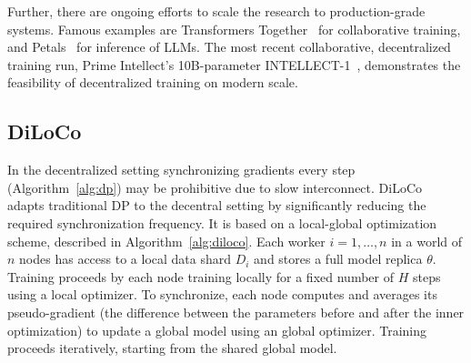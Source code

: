 \documentclass{article}
\begin{document}
Further, there are ongoing efforts to scale the research to production-grade
systems. Famous examples are Transformers
Together~\cite{diskin2021collaborativelearning} for collaborative training, and
Petals~\cite{borzunov2023petals} for inference of LLMs.  The most recent
collaborative, decentralized training run, Prime Intellect's 10B-parameter
INTELLECT-1~\cite{jaghouar2024intellect1}, demonstrates the feasibility of
decentralized training on modern scale.







\subsection{DiLoCo}

In the decentralized setting synchronizing gradients every step
(Algorithm~\ref{alg:dp}) may be prohibitive due to slow interconnect.
DiLoCo~\cite{douillard2023diloco} adapts traditional DP to the decentral setting
by significantly reducing the required synchronization frequency. It is based on
a local-global optimization scheme, described in Algorithm~\ref{alg:diloco}.
Each worker $i=1,\dots,n$ in a world of $n$ nodes has access to a local data
shard $D_i$ and stores a full model replica $\theta$. Training proceeds by each
node training locally for a fixed number of $H$ steps using a local optimizer.
To synchronize, each node computes and averages its pseudo-gradient (the
difference between the parameters before and after the inner optimization) to
update a global model using an global optimizer. Training proceeds iteratively,
starting from the shared global model.
\end{document}
